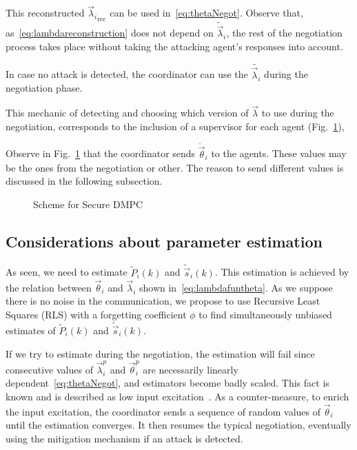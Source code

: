 \documentclass[a4paper, 10 pt, conference]{ieeeconf}  %
\begin{document}
This reconstructed ${\vec{\lambda}_{i}}_{\mathrm{rec}}$ can be used in~\eqref{eq:thetaNegot}. Observe that, as~\eqref{eq:lambdareconstruction} does not depend on $\tilde{\vec{\lambda}}_{i}$, the rest of the negotiation process takes place without taking the attacking agent's responses into account.

In case no attack is detected, the coordinator can use the $\tilde{\vec{\lambda}_{i}}$ during the negotiation phase.

This mechanic of detecting and choosing which version of $\vec{\lambda}$ to use during the negotiation, corresponds to the inclusion of a supervisor for each agent (Fig.~\ref{fig:schemeSafeQuantity}),

Observe in Fig.~\ref{fig:schemeSafeQuantity} that the coordinator sends $\mathring{\vec{\theta}}_{i}$ to the agents. These values may be the ones from the negotiation or other. The reason to send different values is discussed in the following subsection.
\begin{figure}[b]
  \centering
  \scriptsize {}

  \caption{Scheme for Secure DMPC}\label{fig:schemeSafeQuantity}
\end{figure}

\subsection{Considerations about parameter estimation}

As seen, we need to estimate $\tilde{P}_{i}(k)$ and $\tilde{\vec{s}}_{i}(k)$.
This estimation is achieved by the relation between $\vec{\theta}_{i}$ and $\vec{\lambda}_{i}$ shown in~\eqref{eq:lambdafuntheta}.
As we suppose there is no noise in the communication, we propose to use Recursive Least Squares (RLS) with a forgetting coefficient $\phi$ to find simultaneously unbiased estimates of $\tilde{P}_{i}(k)$ and $\tilde{\vec{s}}_{i}(k)$.

If we try to estimate during the negotiation, the estimation will fail since consecutive values of $\vec{\lambda}_{i}^{p}$ and $\vec{\theta}_{i}^{p}$ are necessarily linearly dependent~\eqref{eq:thetaNegot}, and estimators become badly scaled. This fact is known and is described as low input excitation~\cite[\S 5]{AastroemWittenmark1989}.
As a counter-measure, to enrich the input excitation, the coordinator sends a sequence of random values of $\vec{\theta}_{i}$ until the estimation converges. It then resumes the typical negotiation, eventually using the mitigation mechanism if an attack is detected.
\end{document}
